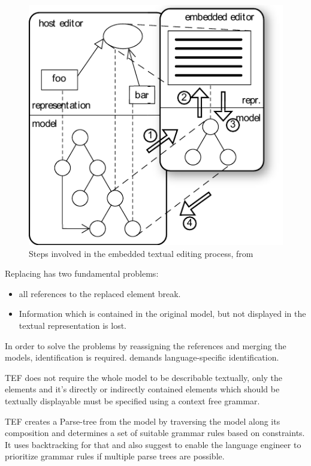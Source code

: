 \begin{figure}
\centering
\includegraphics[scale=1.2]{gfx/ex/tef} 
\caption{Steps involved in the embedded textual editing process, from \cite{TefPaper}}
\label{pic:tef}
\end{figure}

Replacing has two fundamental problems:
\begin{itemize}
	\item all references to the replaced element break.
	\item Information which is contained in the original model, but not displayed in the textual representation is lost.
\end{itemize}
In order to solve the problems by reassigning the references and merging the models, identification is required. \cite{TefPaper} demands language-specific identification. 

TEF does not require the whole model to be describable textually, only the elements and it's directly or indirectly contained elements which should be textually displayable must be specified using a context free grammar.

TEF creates a Parse-tree from the model by traversing the model along its composition and determines a set of suitable grammar rules based on constraints. It uses backtracking for that and \cite{TefPaper} also suggest to enable the language engineer to prioritize grammar rules if multiple parse trees are possible.